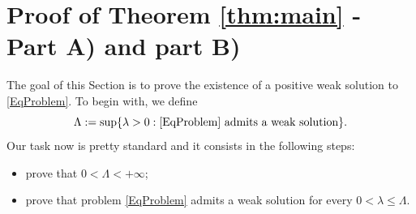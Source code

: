 \documentclass[11pt]{amsart}
\numberwithin{equation}{section} %
\theoremstyle{definition}
\begin{document}
\section{Proof of Theorem \ref{thm:main} - Part A) and part B)}\label{sec:First_Solution}
%
The goal of this Section is to prove the existence of a positive weak solution to \eqref{EqProblem}. 
To begin with, we define
\begin{equation}\label{eq:DefinitionLambda}
	\Lambda := \sup \{ \lambda >0: \eqref{EqProblem} \textrm{ admits a weak solution}\}.
\end{equation}
Our task now is pretty standard and it consists in the following steps: 
\begin{itemize}
	\item[I)] prove that $0<\Lambda<+\infty$;
	\item[II)] prove that problem \eqref{EqProblem} admits a weak solution for every $0<\lambda\leq \Lambda$.
\end{itemize}
\end{document}
